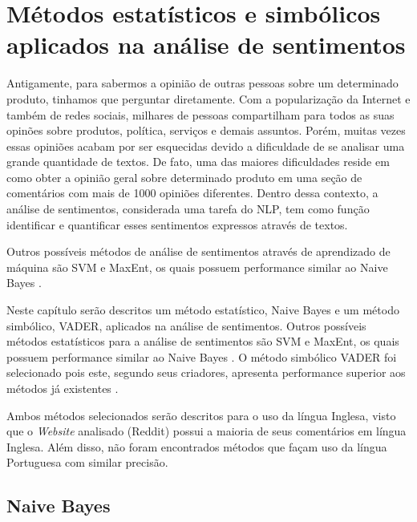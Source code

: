 \chapter{Métodos estatísticos e simbólicos aplicados na análise de sentimentos}
\label{cap:Classificadores}

Antigamente, para sabermos a opinião de outras pessoas sobre um
determinado produto, tinhamos que perguntar diretamente. Com a
popularização da Internet e também de redes sociais, milhares de pessoas
compartilham para todos as suas opinões sobre produtos, política, serviços e
demais assuntos. Porém, muitas vezes essas opiniões acabam
por ser esquecidas devido a dificuldade de se analisar uma grande quantidade de
textos. De fato, uma das maiores dificuldades reside em como obter a opinião
geral sobre determinado produto em uma seção de comentários com mais de 1000
opiniões diferentes. Dentro dessa contexto, a análise de sentimentos,
considerada uma tarefa do \ac{NLP}, tem como função identificar e quantificar esses sentimentos expressos através de textos.

Outros possíveis métodos de análise de sentimentos através de aprendizado de
máquina são \ac{SVM} e \ac{MaxEnt}, os quais possuem
performance similar ao Naive Bayes \cite{domingos97naivebayes}.


Neste capítulo serão descritos um método estatístico, Naive Bayes e um método
simbólico, \ac{VADER}, aplicados na análise de sentimentos. Outros possíveis
métodos estatísticos para a análise de sentimentos são \ac{SVM} e \ac{MaxEnt},
os quais possuem performance similar ao Naive Bayes \cite{Pang:2002:TUS:1118693.1118704}. O método simbólico
\ac{VADER} foi selecionado pois este, segundo seus criadores, apresenta
performance superior aos métodos já existentes \cite{conf/icwsm/HuttoG14}.

Ambos métodos selecionados serão descritos para o uso da língua Inglesa,
visto que o \textit{Website} analisado (Reddit) possui a maioria de seus
comentários em língua Inglesa. Além disso, não foram encontrados métodos que
façam uso da língua Portuguesa com similar precisão.





\section{Naive Bayes}

